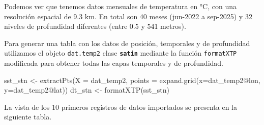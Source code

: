 \documentclass[
]{article}
\newenvironment{Shaded}{\begin{snugshade}}{\end{snugshade}}
\newcommand{\AttributeTok}[1]{\textcolor[rgb]{0.40,0.45,0.13}{#1}}
\newcommand{\FunctionTok}[1]{\textcolor[rgb]{0.28,0.35,0.67}{#1}}
\newcommand{\NormalTok}[1]{\textcolor[rgb]{0.00,0.23,0.31}{#1}}
\newcommand{\OtherTok}[1]{\textcolor[rgb]{0.00,0.23,0.31}{#1}}
\newcommand{\SpecialCharTok}[1]{\textcolor[rgb]{0.37,0.37,0.37}{#1}}
\begin{document}
Podemos ver que tenemos datos mensuales de temperatura en °C, con una
resolución espacial de 9.3 km. En total son 40 meses (jun-2022 a
sep-2025) y 32 niveles de profundidad diferentes (entre 0.5 y 541
metros).

Para generar una tabla con los datos de posición, temporales y de
profundidad utilizamos el objeto \texttt{dat.temp2} clase
\textbf{\texttt{satin}} mediante la función \texttt{formatXTP}
modificada para obtener todas las capas temporales y de profundidad.

\begin{Shaded}
\begin{Highlighting}[]
\NormalTok{sst\_stn }\OtherTok{\textless{}{-}} \FunctionTok{extractPts}\NormalTok{(}\AttributeTok{X =}\NormalTok{ dat\_temp2, }\AttributeTok{points =} \FunctionTok{expand.grid}\NormalTok{(}\AttributeTok{x=}\NormalTok{dat\_temp2}\SpecialCharTok{@}\NormalTok{lon, }\AttributeTok{y=}\NormalTok{dat\_temp2}\SpecialCharTok{@}\NormalTok{lat))}
\NormalTok{dt\_stn }\OtherTok{\textless{}{-}} \FunctionTok{formatXTP}\NormalTok{(sst\_stn)}
\end{Highlighting}
\end{Shaded}

La vista de los 10 primeros registros de datos importados se presenta en
la siguiente tabla.
\end{document}
